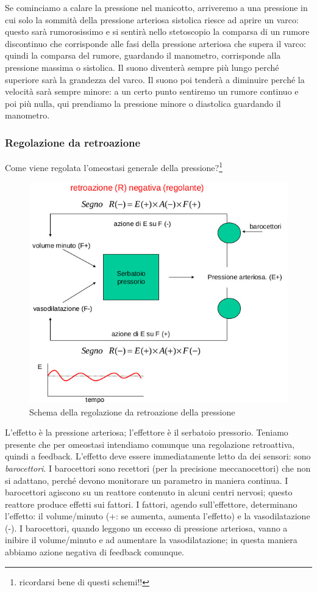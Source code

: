 \documentclass[a4paper,12pt]{article}
\begin{document}
Se cominciamo a calare la pressione nel manicotto, arriveremo a una pressione in cui solo la sommità della pressione arteriosa sistolica riesce ad aprire un varco: questo sarà rumorosissimo e si sentirà nello stetoscopio la comparsa di un rumore discontinuo che corrisponde alle fasi della pressione arteriosa che supera il varco: quindi la comparsa del rumore, guardando il manometro, corrisponde alla pressione massima o sistolica. Il suono diventerà sempre più lungo perché superiore sarà la grandezza del varco. Il suono poi tenderà a diminuire perché la velocità sarà sempre minore: a un certo punto sentiremo un rumore continuo e poi più nulla, qui prendiamo la pressione minore o diastolica guardando il manometro.

\subsubsection{Regolazione da retroazione}
Come viene regolata l'omeostasi generale della pressione?\footnote{ricordarsi bene di questi schemi!!}
\begin{figure}[H]
\centering
\includegraphics[scale=0.35]{immagine/retro.jpg}
\caption{Schema della regolazione da retroazione della pressione}
\end{figure}

L'effetto è la pressione arteriosa; l'effettore è il serbatoio pressorio. Teniamo presente che per omeostasi intendiamo comunque una regolazione retroattiva, quindi a feedback. L'effetto deve essere immediatamente letto da dei sensori: sono \emph{barocettori}. I barocettori sono recettori (per la precisione meccanocettori) che non si adattano, perché devono monitorare un parametro in maniera continua.  I barocettori agiscono su un reattore contenuto in alcuni centri nervosi; questo reattore produce effetti sui fattori. I fattori, agendo sull'effettore, determinano l'effetto: il volume/minuto (+: se aumenta, aumenta l'effetto) e la vasodilatazione (-). I barocettori, quando leggono un eccesso di pressione arteriosa, vanno a inibire il volume/minuto e ad aumentare la vasodilatazione; in questa maniera abbiamo azione negativa di feedback comunque.
\end{document}
